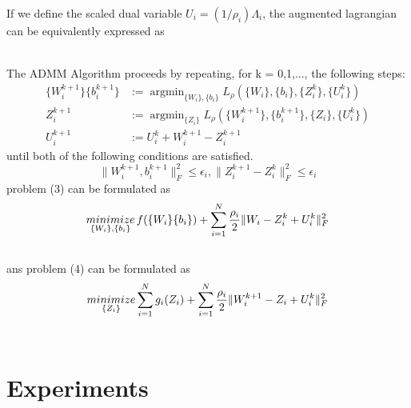 \documentclass{acmtog} %
\begin{document}
If we define the scaled dual variable $U_i = (1/\rho_i)\Lambda_i$, the augmented lagrangian can be equivalently expressed as 
\begin{figure}[h]
\end{figure}\\
The ADMM Algorithm proceeds by repeating, for k = 0,1,..., the following steps:
\begin{align}
  \{W_i^{k+1}\}\{b_i^{k+1}\} &:= \mathop{argmin}_{\{W_i\},\{b_i\}}L_{\rho}(\{W_i\},\{b_i\},\{Z_i^k\},\{U_i^k\})\\
  {Z_i^{k+1}} &:= \mathop{argmin}_{\{Z_i\}}L_{\rho}(\{W_i^{k+1}\},\{b_i^{k+1}\},\{Z_i\},\{U_i^k\})\\
  U_i^{k+1} &:= U_i^k + W_i^{k+1} - Z_i^{k+1}
\end{align}
until both of the following conditions are satisfied.\\
\begin{equation}
  \lVert W_i^{k+1}, b_i^{k+1}\rVert_F^2 \leq \epsilon_i, \lVert Z_i^{k+1} - Z_i^k\rVert_F^2 \leq \epsilon_i
\end{equation}
problem (3) can be formulated as 
\begin{equation*}\label{equ:problem_3}
  \mathop {minimize}_{\{W_i\},\{b_i\}} f(\{W_i\}\{b_i\}) + \sum_{i=1}^N\frac{\rho_i}{2}\lVert W_i - Z_i^k + U_i^k \rVert_F^2\\
\end{equation*}\\
ans problem (4) can be formulated as 
\begin{equation*}\label{equ:problem_3}
  \mathop {minimize}_{\{Z_i\}}\sum_{i=1}^Ng_i(Z_i) + \sum_{i=1}^N\frac{\rho_i}{2}\lVert W_i^{k+1} - Z_i + U_i^k \rVert_F^2\\
\end{equation*}\\
\section{Experiments}
\end{document}
